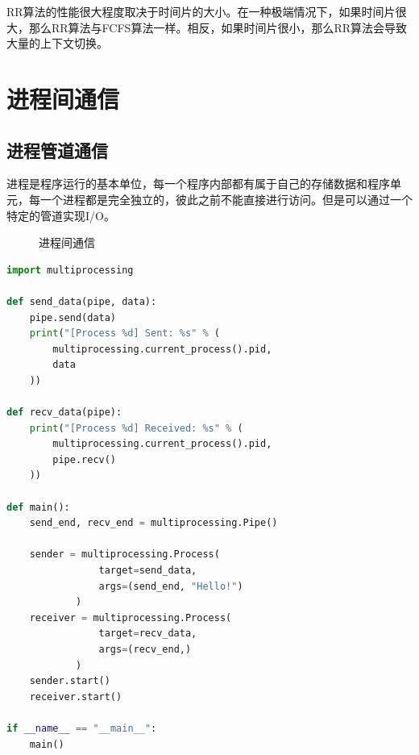 RR算法的性能很大程度取决于时间片的大小。在一种极端情况下，如果时间片很大，那么RR算法与FCFS算法一样。相反，如果时间片很小，那么RR算法会导致大量的上下文切换。

\newpage

\section{进程间通信}

\subsection{进程管道通信}

进程是程序运行的基本单位，每一个程序内部都有属于自己的存储数据和程序单元，每一个进程都是完全独立的，彼此之前不能直接进行访问。但是可以通过一个特定的管道实现I/O。

\begin{figure}[H]
    \centering
    \caption{进程间通信}
\end{figure}

\vspace{0.5cm}


\begin{lstlisting}[language=Python]
import multiprocessing

def send_data(pipe, data):
    pipe.send(data)
    print("[Process %d] Sent: %s" % (
        multiprocessing.current_process().pid,
        data
    ))

def recv_data(pipe):
    print("[Process %d] Received: %s" % (
        multiprocessing.current_process().pid, 
        pipe.recv()
    ))

def main():
    send_end, recv_end = multiprocessing.Pipe()
    
    sender = multiprocessing.Process(
                target=send_data,
                args=(send_end, "Hello!")
            )
    receiver = multiprocessing.Process(
                target=recv_data,
                args=(recv_end,)
            )
    sender.start()
    receiver.start()

if __name__ == "__main__":
    main()
\end{lstlisting}

